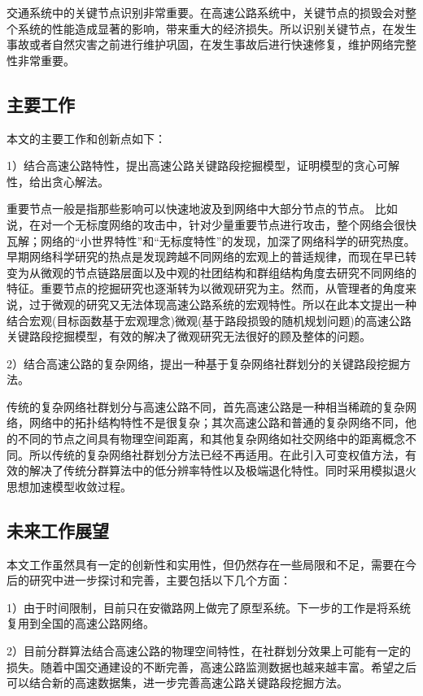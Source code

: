 
	交通系统中的关键节点识别非常重要。在高速公路系统中，关键节点的损毁会对整个系统的性能造成显著的影响，带来重大的经济损失。所以识别关键节点，在发生事故或者自然灾害之前进行维护巩固，在发生事故后进行快速修复，维护网络完整性非常重要。

	\subsection{主要工作}
		本文的主要工作和创新点如下：

		1）结合高速公路特性，提出高速公路关键路段挖掘模型，证明模型的贪心可解性，给出贪心解法。

			重要节点一般是指那些影响可以快速地波及到网络中大部分节点的节点。 比如说，在对一个无标度网络的攻击中，针对少量重要节点进行攻击，整个网络会很快瓦解；网络的“小世界特性”和“无标度特性”的发现，加深了网络科学的研究热度。 早期网络科学研究的热点是发现跨越不同网络的宏观上的普适规律，而现在早已转变为从微观的节点链路层面以及中观的社团结构和群组结构角度去研究不同网络的特征。重要节点的挖掘研究也逐渐转为以微观研究为主。然而，从管理者的角度来说，过于微观的研究又无法体现高速公路系统的宏观特性。所以在此本文提出一种结合宏观(目标函数基于宏观理念)微观(基于路段损毁的随机规划问题)的高速公路关键路段挖掘模型，有效的解决了微观研究无法很好的顾及整体的问题。

		2）结合高速公路的复杂网络，提出一种基于复杂网络社群划分的关键路段挖掘方法。

			传统的复杂网络社群划分与高速公路不同，首先高速公路是一种相当稀疏的复杂网络，网络中的拓扑结构特性不是很复杂；其次高速公路和普通的复杂网络不同，他的不同的节点之间具有物理空间距离，和其他复杂网络如社交网络中的距离概念不同。所以传统的复杂网络社群划分方法已经不再适用。在此引入可变权值方法，有效的解决了传统分群算法中的低分辨率特性以及极端退化特性。同时采用模拟退火思想加速模型收敛过程。
	\subsection{未来工作展望}

		本文工作虽然具有一定的创新性和实用性，但仍然存在一些局限和不足，需要在今后的研究中进一步探讨和完善，主要包括以下几个方面：

		1）由于时间限制，目前只在安徽路网上做完了原型系统。下一步的工作是将系统复用到全国的高速公路网络。

		2）目前分群算法结合高速公路的物理空间特性，在社群划分效果上可能有一定的损失。随着中国交通建设的不断完善，高速公路监测数据也越来越丰富。希望之后可以结合新的高速数据集，进一步完善高速公路关键路段挖掘方法。


